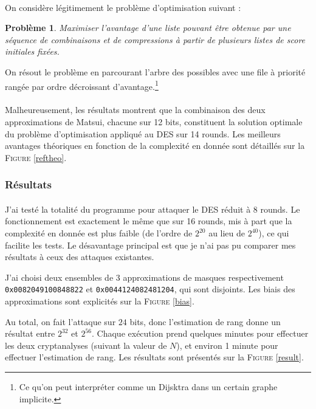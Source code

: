 \documentclass{scrartcl}
\newtheorem*{Prob}{Problème}
\begin{document}
\paragraph*{}
On considère légitimement le problème d'optimisation suivant :

\begin{Prob}
Maximiser l'avantage d'une liste pouvant être obtenue
par une séquence de combinaisons et de compressions à partir de plusieurs listes de score initiales fixées.
\end{Prob}

On résout le problème en parcourant l'arbre des possibles avec une file à priorité rangée par ordre décroissant
d'avantage.\footnote{Ce qu'on peut interpréter comme un Dijsktra dans un certain graphe implicite.}

\paragraph*{}
Malheureusement, les résultats montrent que la combinaison des deux approximations de Matsui, chacune sur 12 bits, constituent la solution optimale
du problème d'optimisation appliqué au DES sur 14 rounds. Les meilleurs avantages théoriques en fonction de la complexité en donnée sont détaillés sur la
\textsc{Figure} \ref{reftheo}.

\subsubsection{Résultats}

\paragraph*{}
J'ai testé la totalité du programme pour attaquer le DES réduit à 8 rounds. Le fonctionnement est exactement le même
que sur 16 rounds, mis à part que la complexité en donnée est plus faible (de l'ordre de $2^{20}$ au lieu de $2^{40}$),
ce qui facilite les tests. Le désavantage principal est que je n'ai pas pu comparer mes résultats à ceux des attaques existantes.

J'ai choisi deux ensembles de 3 approximations de masques respectivement \texttt{0x0082049100848822} et
\texttt{0x0044124082481204}, qui sont disjoints. Les biais des approximations sont explicités sur la \textsc{Figure} \ref{bias}. 

Au total, on fait l'attaque sur $24$ bits, donc l'estimation de rang donne un résultat entre $2^{32}$ et $2^{56}$. Chaque
exécution prend quelques minutes pour effectuer les deux cryptanalyses (suivant la valeur de $N$), et environ 1 minute
pour effectuer l'estimation de rang. Les résultats sont présentés sur la \textsc{Figure} \ref{result}.
	
\end{document}
